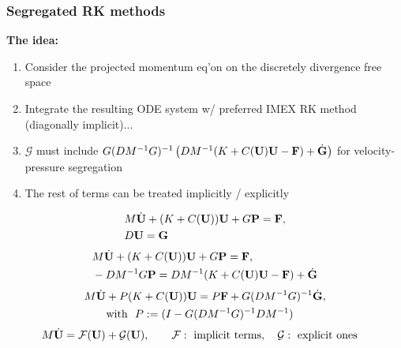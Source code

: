 \begin{frame}
\frametitle{Segregated RK methods}
\textbf{The idea:}
\begin{enumerate}
\item Consider the projected momentum eq'on on the discretely divergence free space
\item<4-> Integrate the resulting ODE system w/ preferred IMEX RK method (diagonally implicit)...
\item<5-> $\mathcal{G}$ must include $G(DM^{-1}G)^{-1} \left( DM^{-1}(K+C({\bf U}){\bf U} - {\bf F})+ \dot{\mathbf{G}} \right)$ for velocity-pressure segregation
\item<6-> The rest of terms can be treated implicitly / explicitly
\end{enumerate}
\begin{overprint}
\begin{align*}
&M\dot{{\bf U}}+(K+C({\bf U})){\bf U}+ G{\bf P}={\bf F},\\
&D{\bf U}= \mathbf{G}
\end{align*}
\begin{align*}
&M\dot{{\bf U}}+(K+C({\bf U})){\bf U}+ G{\bf P}={\bf F},\\
&-DM^{-1}G{\bf P}=DM^{-1}(K+C({\bf U}){\bf U}- {\bf F}) + \dot{\mathbf{G}}
\end{align*}
\begin{align*}
\label{eq:NS_galerkin_ou}
&M\dot{{\bf U}}+ P(K+C({\bf U})){\bf U}  = P{\bf F} + G(DM^{-1}G)^{-1} \dot{\mathbf{G}}, \\ & \qquad \hbox{with } \ P := 
(I - G(DM^{-1}G)^{-1}DM^{-1}) \end{align*}
\begin{align*}
&
M\dot{\U}=\mathcal{F}(\U)+\mathcal{G}(\U), \qquad \mathcal{F}: \hbox{ implicit terms},  \quad \mathcal{G}: \hbox{ explicit ones} %
\end{align*}
\end{overprint}
\end{frame}

